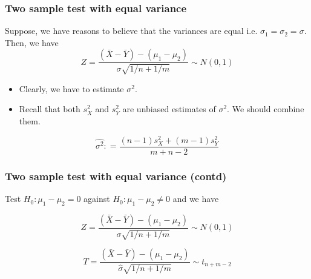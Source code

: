 \documentclass{beamer}\usepackage[]{graphicx}\usepackage[]{color}
\begin{document}
\begin{frame}

\frametitle{Two sample test with equal variance}

Suppose, we have reasons to believe that the variances are equal i.e. $\sigma_1=\sigma_2=\sigma$. Then, we have
$$Z=\frac{(\bar X-\bar Y)-(\mu_1-\mu_2)}{\sigma\sqrt{1/n+1/m}} \sim N(0,1)$$ \pause
\begin{itemize}
\item Clearly, we have to estimate $\sigma^2$. \pause
\item Recall that both $s_X^2$ and $s_Y^2$ are unbiased estimates of $\sigma^2$. We should combine them.
\pause
\end{itemize}


$$ \hat{\sigma^2}: = \frac{(n-1)s_X^2 + (m-1)s_Y^2}{m+n-2} $$

\end{frame}

\begin{frame}

\frametitle{Two sample test with equal variance (contd)}

Test $H_0:\mu_1-\mu_2=0$ against $H_0: \mu_1-\mu_2\ne 0$ and we have

$$Z=\frac{(\bar X-\bar Y)-(\mu_1-\mu_2)}{\sigma\sqrt{1/n+1/m}} \sim N(0,1) $$

$$T=\frac{(\bar X-\bar Y)-(\mu_1-\mu_2)}{\hat{\sigma} \sqrt{1/n+1/m}} \sim t_{n+m-2}$$ \pause


\end{frame}
\end{document}
